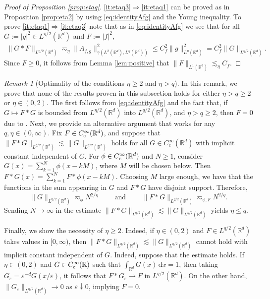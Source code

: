 \documentclass[reqno]{amsart}
\theoremstyle{plain}
\theoremstyle{remark}
\newtheorem{remark}[theorem]{Remark}
\theoremstyle{plain}
\numberwithin{equation}{section}
\def\R{{\mathbb R}}
\newcommand{\di}{\mathrm{d}}
\newcommand{\1}{\one}
\begin{document}
\begin{proof}[Proof of Proposition \ref{prop:etaq}]
\eqref{it:etaq3}$\Rightarrow$\eqref{it:etaq1} can be proved as in Proposition \ref{prop:eta2} by using \eqref{eq:identityAfg} and the Young inequality. 
To prove \eqref{it:etaq1}$\Rightarrow$\eqref{it:etaq3} note that as in \eqref{eq:identityAfg} we see that for all $G:=|g|^2\in L^{\eta/2}(\R^d)$ and $F:=|f|^2$,
\begin{align*}
\|G*F\|_{L^{\eta/2}(\R^d)} \eqsim_{\eta} \|A_{f,g}\|_{\gamma(L^2(\R^d),L^\eta(\R^d))}^2 \leq C_{f}^2 \|g\|_{L^\eta(\R^d)}^2 = C_{f}^2 \|G\|_{L^{\eta/2}(\R^d)}. 
\end{align*}
Since $F\geq 0$, it follows from Lemma \ref{lem:positive} that $\|F\|_{L^1(\R^d)}\lesssim_{\eta} C_{f}$. 
\end{proof}

\begin{remark}[Optimality of the conditions $\eta\geq 2$ and $\eta>q$]
\label{rem:noneetaq}
In this remark, we prove that none of the results proven in this subsection holds for either $\eta>q\geq 2$ or $\eta\in (0,2)$. 
%
The first follows from \eqref{eq:identityAfg} and the fact that, if $G\mapsto F*G$ is bounded from $L^{\eta/2}(\R^d)$ into $L^{q/2}(\R^d)$, and $\eta> q\geq 2$, then $F = 0$ due to \cite[Theorem 2.5.6]{Grafakos1}.  Next, we provide an alternative argument that works for any $q,\eta\in (0,\infty)$. Fix $F\in C^\infty_{{\rm c}}(\R^d)$, and suppose that $\|F*G\|_{L^{q/2}(\R^d)}\lesssim \|G\|_{L^{\eta/2}(\R^d)}$ holds for all $G\in C^\infty_c(\R^d)$ with implicit constant independent of $G$. For $\phi\in C^\infty_{{\rm c}}(\R^d)$ and $N\geq 1$, consider $G(x) = \sum_{k=1}^N \phi(x-kM)$, where $M$ will be chosen below. Then $F*G(x) = \sum_{k=1}^N F*\phi(x-kM)$. Choosing $M$ large enough, we have that the functions in the sum appearing in $G$ and $F*G$ have disjoint support. Therefore, 
\[\|G\|_{L^{\eta/2}(\R^d)} \eqsim_{\phi} N^{2/\eta} \qquad \text{ and } 
\qquad \|F*G\|_{L^{q/2}(\R^d)}\eqsim_{\phi, F} N^{2/q}.\]
Sending $N\to \infty$ in the estimate $\|F*G\|_{L^{q/2}(\R^d)}\lesssim \|G\|_{L^{\eta/2}(\R^d)}$ yields $\eta\leq q$. 

Finally, we show the necessity of $\eta\geq 2$. Indeed, if $\eta\in (0,2)$ and $F\in L^{q/2}(\R^d)$ takes values in $[0,\infty)$, then $\|F*G\|_{L^{q/2}(\R^d)}\lesssim \|G\|_{L^{\eta/2}(\R^d)}$ cannot hold with implicit constant independent of $G$. 
Indeed, suppose that the estimate holds. If $\eta\in (0,2)$ and $G\in C^{\infty}_{{\rm c}}(\R)$ such that $\int_{\R^d}G(x)\,\di x =1$, then taking $G_{\varepsilon} = \varepsilon^{-d} G(x/\varepsilon)$, it follows that $F*G_{\varepsilon}\to F$ in $L^{q/2}(\R^d)$. On the other hand, $\|G_{\varepsilon}\|_{L^{\eta/2}(\R^d)}\to 0$ as $\varepsilon\downarrow 0$, implying $F=0$. 
\end{remark}
\end{document}
